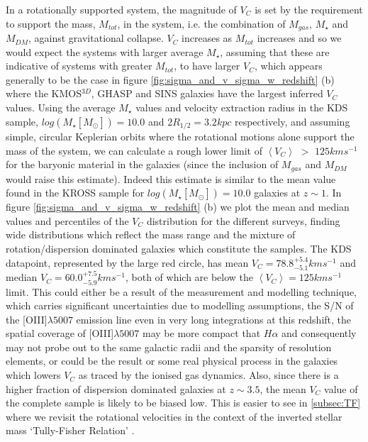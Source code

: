 \documentclass[fleqn,usenatbib]{mn2e}
\begin{document}
In a rotationally supported system, the magnitude of $V_{C}$ is set by the requirement to support the mass, $M_{tot}$, in the system, i.e. the combination of $M_{gas}$, $M_{\star}$ and $M_{DM}$, against gravitational collapse.
$V_{C}$ increases as $M_{tot}$ increases and so we would expect the systems with larger average $M_{\star}$, assuming that these are indicative of systems with greater $M_{tot}$, to have larger $V_{C}$, which appears generally to be the case in figure \ref{fig:sigma_and_v_sigma_w_redshift} (b) where the KMOS$^{3D}$, GHASP and SINS galaxies have the largest inferred $V_{C}$ values.
Using the average $M_{\star}$ values and velocity extraction radius in the KDS sample, $log(M_{\star}[M_{\odot}])=10.0$ and $2R_{1/2} = 3.2kpc$ respectively, and assuming simple, circular Keplerian orbits where the rotational motions alone support the mass of the system, we can calculate a rough lower limit of $\left<V_{C}\right>$ $>$ $125kms^{-1}$ for the baryonic material in the galaxies (since the inclusion of $M_{gas}$ and $M_{DM}$ would raise this estimate).
Indeed this estimate is similar to the mean value found in the KROSS sample for $log(M_{\star}[M_{\odot}])=10.0$ galaxies at $z\sim1$.
In figure \ref{fig:sigma_and_v_sigma_w_redshift} (b) we plot the mean and median values and percentiles of the $V_{C}$ distribution for the different surveys, finding wide distributions which reflect the mass range and the mixture of rotation/dispersion dominated galaxies which constitute the samples.
The KDS datapoint, represented by the large red circle, has mean $V_{C} = 78.8^{+5.4}_{-5.1}kms^{-1}$ and median $V_{C} = 60.0^{+7.5}_{-5.9}kms^{-1}$, both of which are below the $\left<V_{C}\right> = 125kms^{-1}$ limit.
This could either be a result of the measurement and modelling technique, which carries significant uncertainties due to modelling assumptions, the S/N of the [OIII]$\lambda5007$ emission line even in very long integrations at this redshift, the spatial coverage of [OIII]$\lambda5007$ may be more compact that $H\alpha$ and consequently may not probe out to the same galactic radii and the sparsity of resolution elements, or could be the result or some real physical process in the galaxies which lowers $V_{C}$ as traced by the ionised gas dynamics.
Also, since there is a higher fraction of dispersion dominated galaxies at $z\sim3.5$, the mean $V_{C}$ value of the complete sample is likely to be biased low.
This is easier to see in \cref{subsec:TF} where we revisit the rotational velocities in the context of the inverted stellar mass `Tully-Fisher Relation' \citep[smTFR;][]{Tully1977,Bell2000a}.
\end{document}
